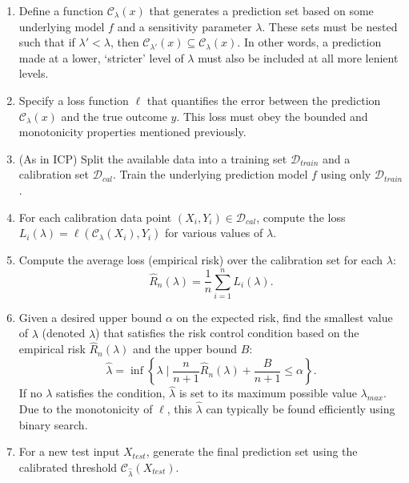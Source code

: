 \begin{enumerate}
    \item Define a function \(\mathcal{C}_\lambda(x)\) that generates a prediction set
    based on some underlying model \(f\) and a sensitivity parameter \(\lambda\).
    These sets must be nested such that if \(\lambda' < \lambda\),
    then \(\mathcal{C}_{\lambda'}(x) \subseteq \mathcal{C}_{\lambda}(x)\).
    In other words, a prediction made at a lower, `stricter' level of \(\lambda\)
    must also be included at all more lenient levels.

    \item Specify a loss function \(\ell\) that quantifies the error
    between the prediction \(\mathcal{C}_\lambda(x)\) and the true outcome \(y\).
    This loss must obey the bounded and monotonicity properties mentioned previously.

    \item (As in ICP) Split the available data into a training set \(\mathcal{D}_{train}\)
    and a calibration set \(\mathcal{D}_{cal}\).
    Train the underlying prediction model \(f\) using only \(\mathcal{D}_{train}\).

    \item For each calibration data point \((X_i, Y_i) \in \mathcal{D}_{cal}\),
    compute the loss \(L_i(\lambda) = \ell(\mathcal{C}_\lambda(X_i), Y_i)\)
    for various values of \(\lambda\).

    \item Compute the average loss (empirical risk) over the calibration set for each \(\lambda\):
    \[
        \hat{R}_n(\lambda) = \frac{1}{n} \sum_{i=1}^n L_i(\lambda).
    \]

    \item Given a desired upper bound \(\alpha\) on the expected risk,
    find the smallest value of \(\lambda\) (denoted \(\hat{\lambda}\))
    that satisfies the risk control condition based on the empirical risk \(\hat{R}_n(\lambda)\)
    and the upper bound \(B\):
    \[
        \hat{\lambda} = \inf \left\{ \lambda \mid
        \frac{n}{n+1} \hat{R}_n(\lambda) + \frac{B}{n+1} \le \alpha \right\}.
    \]
    If no \(\lambda\) satisfies the condition,
    \(\hat{\lambda}\) is set to its maximum possible value \(\lambda_{max}\).
    Due to the monotonicity of \(\ell\), this \(\hat{\lambda}\)
    can typically be found efficiently using binary search.

    \item For a new test input \(X_{test}\),
    generate the final prediction set using the calibrated threshold \(\mathcal{C}_{\hat{\lambda}}(X_{test})\).
 \end{enumerate}

